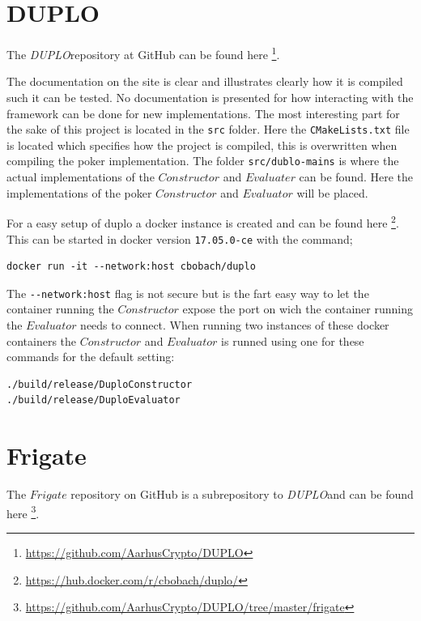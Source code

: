 \documentclass[twoside,11pt,openright]{report}
\newcommand{\DUPLO}{\textit{DUPLO}}
\begin{document}
\begin{appendices}
\section{DUPLO}
\label{app:duplo}
The \DUPLO repository at GitHub can be found here \footnote{\url{https://github.com/AarhusCrypto/DUPLO}}.

The documentation on the site is clear and illustrates clearly how it is compiled such it can be tested. No documentation is presented for how interacting with the framework can be done for new implementations. The most interesting part for the sake of this project is located in the \verb|src| folder. Here the \verb|CMakeLists.txt| file is located which specifies how the project is compiled, this is overwritten when compiling the poker implementation. The folder \verb|src/dublo-mains| is where the actual implementations of the $Constructor$ and $Evaluater$ can be found. Here the implementations of the poker $Constructor$ and $Evaluator$ will be placed.

\bigskip

For a easy setup of duplo a docker instance is created and can be found here \footnote{\url{https://hub.docker.com/r/cbobach/duplo/}}. This can be started in docker version \verb|17.05.0-ce| with the command;

\begin{center}
\begin{verbatim}
docker run -it --network:host cbobach/duplo
\end{verbatim}
\end{center}

The \verb|--network:host| flag is not secure but is the fart easy way to let the container running the $Constructor$ expose the port on wich the container running the $Evaluator$ needs to connect. When running two instances of these docker containers the $Constructor$ and $Evaluator$ is runned using one for these commands for the default setting:

\begin{center}
\begin{verbatim}
./build/release/DuploConstructor 
./build/release/DuploEvaluator
\end{verbatim}
\end{center}


\section{Frigate}
\label{app:frigate}
The $Frigate$ repository on GitHub is a subrepository to \DUPLO and can be found here \footnote{\url{https://github.com/AarhusCrypto/DUPLO/tree/master/frigate}}.


\end{appendices}
\end{document}
